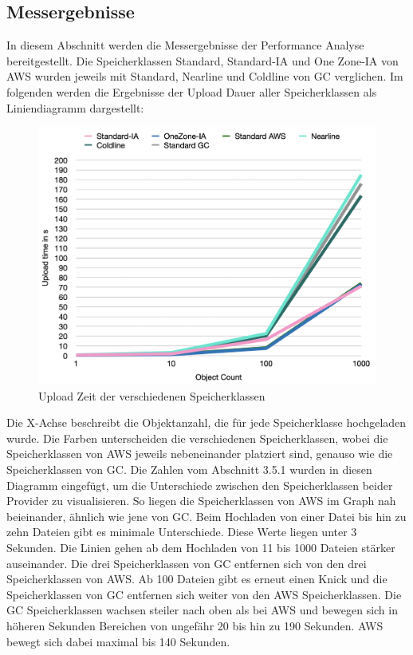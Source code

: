 \newpage
\subsection{Messergebnisse}

In diesem Abschnitt werden die Messergebnisse der Performance Analyse bereitgestellt. Die Speicherklassen Standard, Standard-IA und One Zone-IA von AWS wurden jeweils mit Standard, Nearline und Coldline von GC verglichen. Im folgenden werden die Ergebnisse der Upload Dauer aller Speicherklassen als Liniendiagramm dargestellt:

\begin{figure}[h]
	\centering
	\includegraphics[width=14cm,keepaspectratio]{Pictures/UploadTime.png}
	\caption{Upload Zeit der verschiedenen Speicherklassen}
\end{figure}	

Die X-Achse beschreibt die Objektanzahl, die für jede Speicherklasse hochgeladen wurde. Die Farben unterscheiden die verschiedenen Speicherklassen, wobei die Speicherklassen von AWS jeweils nebeneinander platziert sind, genauso wie die Speicherklassen von GC. Die Zahlen vom Abschnitt 3.5.1 wurden in diesen Diagramm eingefügt, um die Unterschiede zwischen den Speicherklassen beider Provider zu visualisieren. So liegen die Speicherklassen von AWS im Graph nah beieinander, ähnlich wie jene von GC. Beim Hochladen von einer Datei bis hin zu zehn Dateien gibt es minimale Unterschiede. Diese Werte liegen unter 3 Sekunden. Die Linien gehen ab dem Hochladen von 11 bis 1000 Dateien stärker auseinander. Die drei Speicherklassen von GC entfernen sich von den drei Speicherklassen von AWS. Ab 100 Dateien gibt es erneut einen Knick und die Speicherklassen von GC entfernen sich weiter von den AWS Speicherklassen. Die GC Speicherklassen wachsen steiler nach oben als bei AWS und bewegen sich in höheren Sekunden Bereichen von ungefähr 20 bis hin zu 190 Sekunden. AWS bewegt sich dabei maximal bis 140 Sekunden. 

